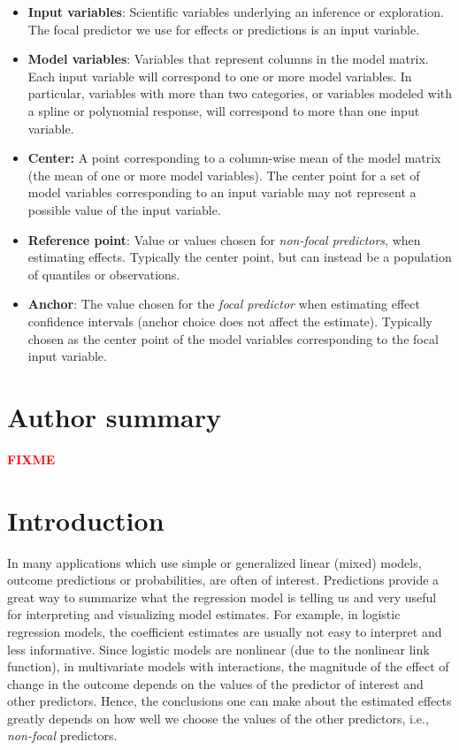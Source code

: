 \documentclass[10pt,letterpaper]{article}
\newcommand{\fix}{{\bf \textcolor{red}{FIXME}}}
\begin{document}
\begin{itemize}
\item \textbf{Input variables}: Scientific variables underlying an inference or exploration. The focal predictor we use for effects or predictions is an input variable.
\item \textbf{Model variables}: Variables that represent columns in the model matrix. Each input variable will correspond to one or more model variables. In particular, variables with more than two categories, or variables modeled with a spline or polynomial response, will correspond to more than one input variable.
\item\textbf{Center:} A point corresponding to a column-wise mean of the model matrix (the mean of one or more model variables). The center point for a set of model variables corresponding to an input variable may not represent a possible value of the input variable.
\item \textbf{Reference point}: Value or values chosen for \emph{non-focal predictors}, when estimating effects. Typically the center point, but can instead be a population of quantiles or observations. 
\item \textbf{Anchor}: The value chosen for the \emph{focal predictor} when estimating effect confidence intervals (anchor choice does not affect the estimate). Typically chosen as the center point of the model variables corresponding to the focal input variable.
\end{itemize}

\section*{Author summary}

\fix

\linenumbers

\section*{Introduction}

In many applications which use simple or generalized linear (mixed) models, outcome predictions or probabilities, are often of interest. Predictions provide a great way to summarize what the regression model is telling us and very useful for interpreting and visualizing model estimates. For example, in logistic regression models, the coefficient estimates are usually not easy to interpret and less informative. Since logistic models are nonlinear (due to the nonlinear link function), in multivariate models with interactions, the magnitude of the effect of change in the outcome depends on the values of the predictor of interest and other predictors. Hence, the conclusions one can make about the estimated effects greatly depends on how well we choose the values of the other predictors, i.e., \emph{non-focal} predictors.  
\end{document}
